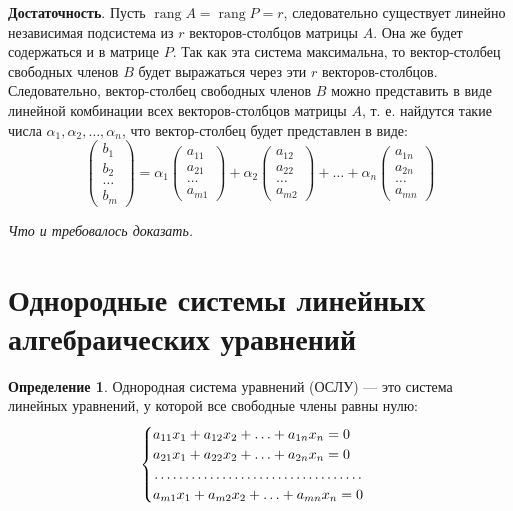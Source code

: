 \documentclass[a5paper, 11pt]{extbook}
\theoremstyle{definition}
\theoremstyle{definition}
\newtheorem{definition}{Определение}[chapter]
\newcommand{\newpar}{$ $\par\nobreak\ignorespaces}
\renewenvironment{proof}{{\noindent\bfseries Доказательство.}}{\smallskip\newpar \hfill\textit{Что и требовалось доказать.}}
\DeclareMathOperator{\rang}{rang}
\begin{document}
\begin{proof}
    \textbf{Достаточность}. Пусть \(\rang A = \rang P = r\), следовательно существует линейно независимая подсистема из \(r\) векторов-столбцов матрицы \(A\). Она же будет содержаться и в матрице \(P\). Так как эта система максимальна, то вектор-столбец свободных членов \(B\) будет выражаться через эти \(r\) векторов-столбцов. Следовательно, вектор-столбец свободных членов \(B\) можно представить в виде линейной комбинации всех векторов-столбцов матрицы \(A\), т. е. найдутся такие числа \(\alpha_1, \alpha_2, \ldots, \alpha_n\), что вектор-столбец будет представлен в виде:
    \begin{equation*}
        \begin{pmatrix}
            b_1    \\
            b_2    \\
            \ldots \\
            b_m
        \end{pmatrix}
        =
        \alpha_1
        \begin{pmatrix}
            a_{11} \\
            a_{21} \\
            \ldots \\
            a_{m1}
        \end{pmatrix}
        +
        \alpha_2
        \begin{pmatrix}
            a_{12} \\
            a_{22} \\
            \ldots \\
            a_{m2}
        \end{pmatrix}
        + \ldots +
        \alpha_n
        \begin{pmatrix}
            a_{1n} \\
            a_{2n} \\
            \ldots \\
            a_{mn}
        \end{pmatrix}
    \end{equation*}
\end{proof}


\section{Однородные системы линейных алгебраических уравнений}

\begin{definition}
    Однородная система уравнений (ОСЛУ) — это система линейных уравнений, у которой все свободные члены равны нулю:
    \begin{equation*}
        \begin{cases}
            a_{11} x_1 + a_{12} x_2 + \ldots + a_{1n} x_n = 0 \\
            a_{21} x_1 + a_{22} x_2 + \ldots + a_{2n} x_n = 0 \\
            \dotfill                                          \\
            a_{m1} x_1 + a_{m2} x_2 + \ldots + a_{mn} x_n = 0
        \end{cases}
    \end{equation*}
\end{definition}
\end{document}
